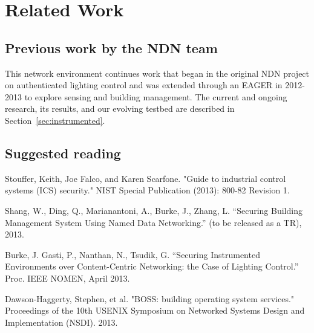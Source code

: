 \section{Related Work}

\subsection{Previous work by the NDN team}

This network environment continues work that began in the original NDN project on authenticated lighting control and was extended through an EAGER in 2012-2013 to explore sensing and building management.  The current and ongoing research, its results, and our evolving testbed are described in Section~\ref{sec:instrumented}.  

\subsection{Suggested reading}

Stouffer, Keith, Joe Falco, and Karen Scarfone. "Guide to industrial control systems (ICS) security." NIST Special Publication (2013): 800-82 Revision 1.

Shang, W., Ding, Q., Marianantoni, A., Burke, J., Zhang, L. “Securing Building Management System Using Named Data Networking.”  (to be 
released as a TR), 2013. 

Burke, J. Gasti, P., Nanthan, N., Tsudik, G. “Securing Instrumented Environments over Content-Centric Networking: the Case of Lighting Control.”  Proc. IEEE NOMEN, April 2013. 

Dawson-Haggerty, Stephen, et al. "BOSS: building operating system services." Proceedings of the 10th USENIX Symposium on Networked Systems Design and Implementation (NSDI). 2013.
